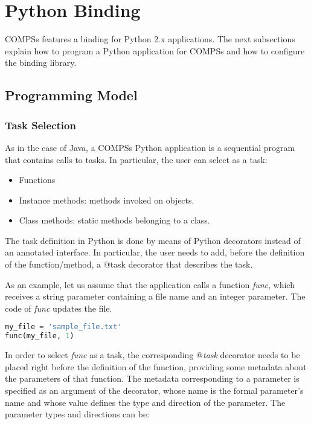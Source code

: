 \section{Python Binding}
\label{sec:Python}

COMPSs features a binding for Python 2.x applications. The next subsections explain how to program a Python 
application for COMPSs and how to configure the binding library.

\subsection{Programming Model}

\subsubsection{Task Selection}

As in the case of Java, a COMPSs Python application is a sequential program that contains calls 
to tasks. In particular, the user can select as a task:

\begin{itemize}
 \item Functions
 \item Instance methods: methods invoked on objects.
 \item Class methods: static methods belonging to a class.
\end{itemize}

The task definition in Python is done by means of Python decorators instead of an annotated interface. In particular, the user needs to add, before the definition of the function/method, 
a $@$task decorator that describes the task.

As an example, let us assume that the application calls a function \textit{func}, which receives a string parameter 
containing a file name and an integer parameter. The code of \textit{func} updates the file.

\begin{lstlisting}[language=python]
my_file = 'sample_file.txt'
func(my_file, 1)
\end{lstlisting}

In order to select {\it func} as a task, the corresponding {\it $@$task} decorator needs to be placed right 
before the definition of the function, providing some metadata about the parameters of that function. 
The metadata corresponding to a parameter is specified as an argument of the decorator, whose name is 
the formal parameter’s name and whose value defines the type and direction of the parameter. 
The parameter types and directions can be:

